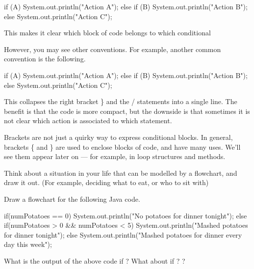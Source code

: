\begin{code}
if (A) 
{
    System.out.println("Action A");
}
else if (B)
{
    System.out.println("Action B");
}
else
{
    System.out.println("Action C");
}
\end{code}

This makes it clear which block of code belongs to which conditional

However, you may see other conventions. For example, another common convention is the following.

\begin{code}
if (A) {
    System.out.println("Action A");
} else if (B) {
    System.out.println("Action B");
} else {
    System.out.println("Action C");
}
\end{code}

This collapses the right bracket \} and the / statements into a single line. The benefit is that the code is more compact, but the downside is that sometimes it is not clear which action is associated to which statement. 

Brackets are not just a quirky way to express conditional blocks. In general, brackets \{ and \} are used to enclose blocks of code, and have many uses. We'll see them appear later on --- for example, in loop structures and methods. 

\exercisesection



\begin{exercise}
Think about a situation in your life that can be modelled by a flowchart, and draw it out. (For example, deciding what to eat, or who to sit with)
\end{exercise}

\begin{exercise}
Draw a flowchart for the following Java code.

\begin{code}
if(numPotatoes == 0)
{
    System.out.println("No potatoes for dinner tonight");
}
else if(numPotatoes > 0 && numPotatoes < 5)
{
    System.out.println("Mashed potatoes for dinner tonight");
}
else
{
    System.out.println("Mashed potatoes for dinner every day this week");
}
\end{code}

What is the output of the above code if ? What about if ? ?

\end{exercise}

